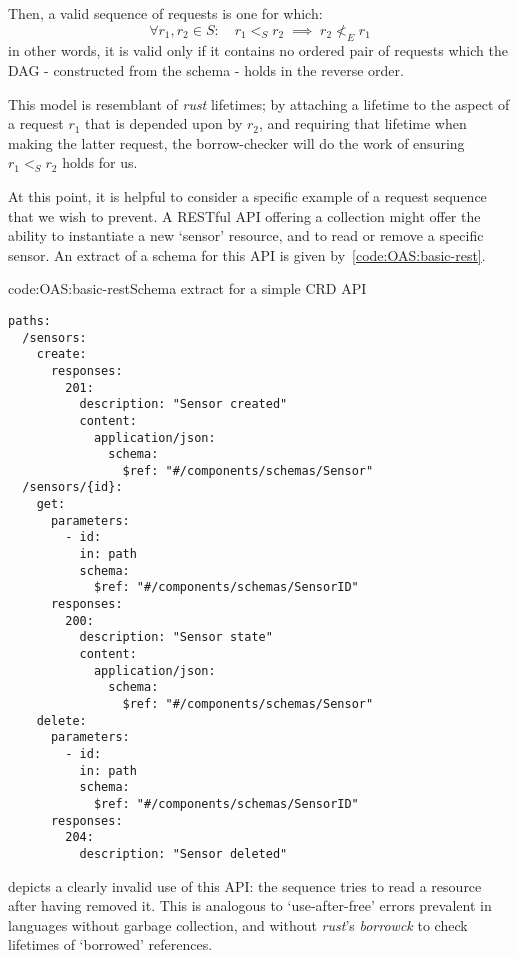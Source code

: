 Then, a valid sequence of requests is one for which:\[
\forall{r_1,r_2\in{S}}\colon\quad
r_1 <_{S} r_2 \;\implies\; r_2 \nless_{E} r_1
\] in other words, it is valid only if it contains no ordered pair of requests which the DAG - constructed from the schema - holds in the reverse order.

This model is resemblant of \emph{rust} lifetimes; by attaching a lifetime to the aspect of a request $r_1$ that is depended upon by $r_2$, and requiring that lifetime when making the latter request, the borrow-checker will do the work of ensuring $r_1 <_{S} r_2$ holds for us.

At this point, it is helpful to consider a specific example of a request sequence that we wish to prevent. A RESTful  API offering a collection  might offer the ability to instantiate a new `sensor' resource, and to read or remove a specific sensor. An extract of a schema for this API is given by~\cref{code:OAS:basic-rest}.

\begin{codelisting}{code:OAS:basic-rest}{Schema extract for a simple CRD API}
\begin{spacing}{\codespacing}
\begin{verbatim}
paths:
  /sensors:
    create:
      responses:
        201:
          description: "Sensor created"
          content:
            application/json:
              schema:
                $ref: "#/components/schemas/Sensor"
  /sensors/{id}:
    get:
      parameters:
        - id:
          in: path
          schema:
            $ref: "#/components/schemas/SensorID"
      responses:
        200:
          description: "Sensor state"
          content:
            application/json:
              schema:
                $ref: "#/components/schemas/Sensor"
    delete:
      parameters:
        - id:
          in: path
          schema:
            $ref: "#/components/schemas/SensorID"
      responses:
        204:
          description: "Sensor deleted"
\end{verbatim}
\end{spacing}
\end{codelisting}

 depicts a clearly invalid use of this API: the sequence tries to read a resource after having removed it. This is analogous to `use-after-free' errors prevalent in languages without garbage collection, and without \emph{rust}'s \emph{borrowck} to check lifetimes of `borrowed' references.


